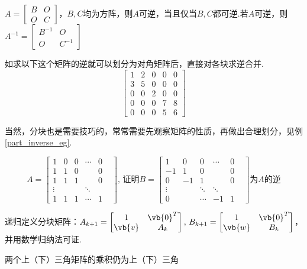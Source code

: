 \begin{corollary}
\label{part_inverse_col}
$A=\begin{bmatrix}B&O \\ O&C\end{bmatrix}$，$B,C$均为方阵，则$A$可逆，当且仅当$B,C$都可逆.若$A$可逆，则$A^{-1}=\begin{bmatrix}B^{-1}&O \\ O&C^{-1}\end{bmatrix}$
\end{corollary}
如求以下这个矩阵的逆就可以划分为对角矩阵后，直接对各块求逆合并.
\[\begin{bmatrix}
1&2&0&0&0\\
3&5&0&0&0\\
0&0&2&0&0\\
0&0&0&7&8\\
0&0&0&5&6
\end{bmatrix}\]
\par 当然，分块也是需要技巧的，常常需要先观察矩阵的性质，再做出合理划分，见例\ref{part_inverse_eg}.
\begin{example}%
\label{part_inverse_eg}
\[A=\begin{bmatrix}1&0&0&\cdots&0\\1&1&0& &0\\1&1&1& &0\\\vdots& & &\ddots& &\\1&1&1&\cdots&1\end{bmatrix},\,\text{证明}B=\begin{bmatrix}1&0&0&\cdots&0\\-1&1&0& &0\\0&-1&1& &0\\\vdots& &\ddots &\ddots& &\\0& &\cdots&-1&1\end{bmatrix}\text{为$A$的逆}\]
\end{example}
\begin{analysis}
递归定义分块矩阵：$A_{k+1}=\begin{bmatrix}1&\vb{0}^T\\\vb{v}&A_k\end{bmatrix},\,B_{k+1}=\begin{bmatrix}1&\vb{0}^T\\\vb{w}&B_k\end{bmatrix}$，并用数学归纳法可证.
\end{analysis}
\begin{theorem}
两个上（下）三角矩阵的乘积仍为上（下）三角
\end{theorem}
